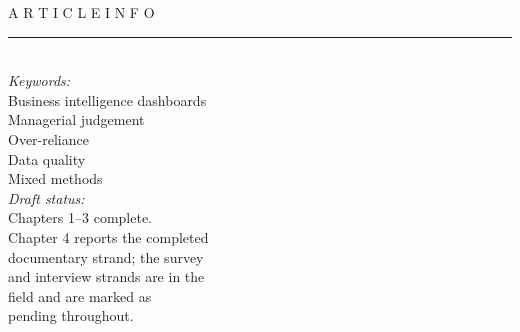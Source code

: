 \documentclass[11pt,a4paper]{article}
\numberwithin{figure}{section}
\numberwithin{table}{section}
\begin{document}
\noindent
\begin{minipage}[t]{0.27\textwidth}
{\footnotesize\sffamily A R T I C L E \; I N F O}\\[2pt]
{\color{rulegrey}\rule{\linewidth}{0.4pt}}\\[4pt]
{\footnotesize\itshape Keywords:}\\[2pt]
{\footnotesize
Business intelligence dashboards\\
Managerial judgement\\
Over-reliance\\
Data quality\\
Mixed methods\\[8pt]}
{\footnotesize\itshape Draft status:}\\[2pt]
{\footnotesize
Chapters 1--3 complete.\\
Chapter 4 reports the completed\\
documentary strand; the survey\\
and interview strands are in the\\
field and are marked as\\
pending throughout.}
\end{minipage}\hfill
\end{document}
